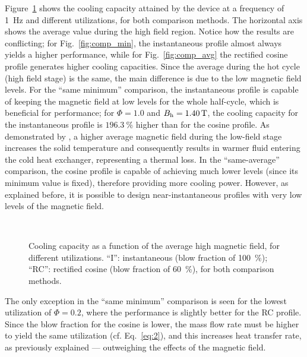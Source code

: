 \documentclass[draft]{svjour3}
\begin{document}
Figure~\ref{fig:cos_ins} shows the cooling capacity attained by the device at a frequency of \SI{1}{\hertz} and different utilizations, for both comparison methods.  The horizontal axis shows the average value during the high field region. Notice how the results are conflicting; for Fig.~\ref{fig:comp_min}, the instantaneous profile almost always yields a higher performance, while for Fig.~\ref{fig:comp_avg} the rectified cosine profile generates higher cooling capacities. Since the average during the hot cycle (high field stage) is the same, the main difference is due to the low magnetic field levels. For the ``same minimum'' comparison, the instantaneous profile is capable of keeping the magnetic field at low levels for the whole half-cycle, which is beneficial for performance;  for $\Phi=1.0$ and $B_{\mathrm{h}} = \SI{1.40}{\tesla}$, the cooling capacity for the instantaneous profile is $\SI{196.3}{\percent}$ higher than for the cosine profile.  As demonstrated by \cite{bib:asme-mce}, a higher average magnetic field during the low-field stage increases the solid temperature and consequently results in  warmer fluid entering the cold heat exchanger, representing a thermal loss. In the ``same-average'' comparison, the cosine profile is capable of achieving much lower levels (since its minimum value is fixed), therefore providing more cooling power. However, as explained before, it is possible to design near-instantaneous profiles with very low levels of the magnetic field.


\begin{figure}[!ht]
  \centering
\,
\,
  \caption{Cooling capacity as a function of the  average high magnetic field, for different utilizations. “I”: instantaneous (blow fraction of \SI{100}{\percent}); “RC”: rectified cosine  (blow fraction of \SI{60}{\percent}), for both comparison methods.}
 \label{fig:cos_ins}
\end{figure}

The only exception in the ``same minimum'' comparison is seen for the lowest utilization of $\Phi = 0.2$, where the performance is slightly better for the RC profile. Since the blow fraction for the cosine is lower, the mass flow rate must be higher to yield the same utilization (cf. Eq.~\eqref{eq:2}), and this increases heat transfer rate, as previously explained ---  outweighing the effects of the magnetic field.
\end{document}
